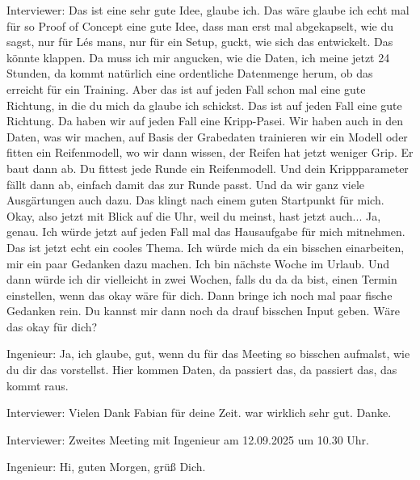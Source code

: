 Interviewer:
Das ist eine sehr gute Idee, glaube ich. Das wäre glaube ich echt mal für so Proof of Concept eine gute Idee, dass man erst mal abgekapselt, wie du sagst, nur für Lés mans, nur für ein Setup, guckt, wie sich das entwickelt. Das könnte klappen. Da muss ich mir angucken, wie die Daten, ich meine jetzt 24 Stunden, da kommt natürlich eine ordentliche Datenmenge herum, ob das erreicht für ein Training. Aber das ist auf jeden Fall schon mal eine gute Richtung, in die du mich da glaube ich schickst. Das ist auf jeden Fall eine gute Richtung. Da haben wir auf jeden Fall eine Kripp-Pasei. Wir haben auch in den Daten, was wir machen, auf Basis der Grabedaten trainieren wir ein Modell oder fitten ein Reifenmodell, wo wir dann wissen, der Reifen hat jetzt weniger Grip. Er baut dann ab. Du fittest jede Runde ein Reifenmodell. Und dein Krippparameter fällt dann ab, einfach damit das zur Runde passt. Und da wir ganz viele Ausgärtungen auch dazu.  Das klingt nach  einem guten  Startpunkt für mich. Okay, also jetzt mit Blick auf die Uhr, weil du meinst, hast jetzt auch... Ja, genau. Ich würde jetzt auf jeden Fall mal das Hausaufgabe für mich mitnehmen. Das ist jetzt echt ein cooles Thema. Ich würde mich da ein bisschen einarbeiten, mir ein paar Gedanken dazu machen. Ich bin nächste Woche im Urlaub. Und dann würde ich dir vielleicht in zwei Wochen, falls du da da bist, einen Termin einstellen, wenn das okay wäre für dich.  Dann bringe ich noch mal paar fische Gedanken rein. Du kannst mir dann noch da drauf bisschen Input geben. Wäre das okay für dich? 

Ingenieur:
Ja, ich glaube, gut, wenn du für das Meeting so bisschen aufmalst, wie du dir das vorstellst. Hier kommen Daten, da passiert das, da passiert das, das kommt raus. 

Interviewer:
Vielen Dank Fabian für deine Zeit. war wirklich sehr gut. Danke.

\nolinenumbers

\label{transkript-meeting2}
\setcounter{linenumber}{1}
\linenumbers

Interviewer:
Zweites Meeting mit Ingenieur am 12.09.2025 um  10.30 Uhr.

Ingenieur:
Hi, guten Morgen, grüß Dich. 

